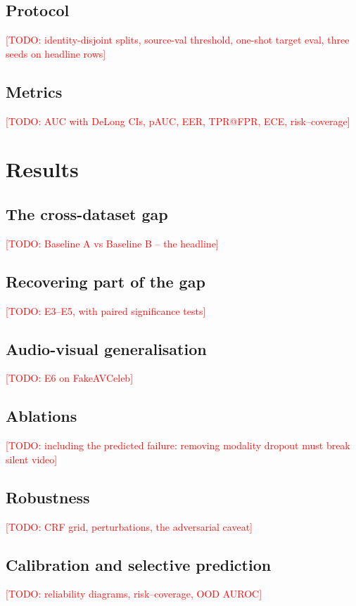 \documentclass[conference]{IEEEtran}
\newcommand{\todo}[1]{\textcolor{red}{[TODO: #1]}}
\begin{document}
\subsection{Protocol}
\todo{identity-disjoint splits, source-val threshold, one-shot target eval,
three seeds on headline rows}

\subsection{Metrics}
\todo{AUC with DeLong CIs, pAUC, EER, TPR@FPR, ECE, risk--coverage}

\section{Results}



\subsection{The cross-dataset gap}
\todo{Baseline A vs Baseline B -- the headline}

\subsection{Recovering part of the gap}
\todo{E3--E5, with paired significance tests}

\subsection{Audio-visual generalisation}
\todo{E6 on FakeAVCeleb}

\subsection{Ablations}
\todo{including the predicted failure: removing modality dropout must break
silent video}

\subsection{Robustness}
\todo{CRF grid, perturbations, the adversarial caveat}

\subsection{Calibration and selective prediction}
\todo{reliability diagrams, risk--coverage, OOD AUROC}
\end{document}
